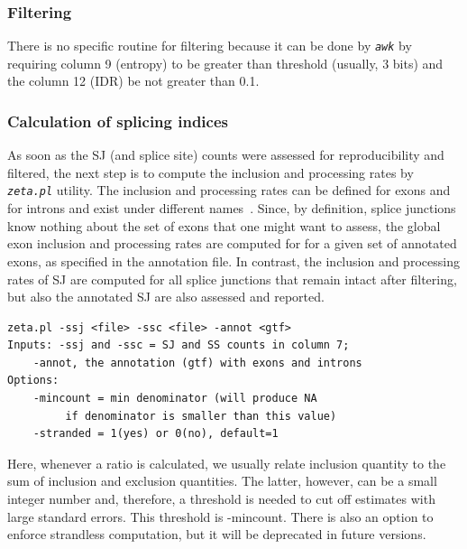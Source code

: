 \documentclass{article}
\newcommand{\prog}[1]{{\tt\em #1}}
\begin{document}
\subsubsection{Filtering}

There is no specific routine for filtering because it can be done by \prog{awk} by requiring column 9 (entropy)
to be greater than threshold (usually, 3 bits) and the column 12 (IDR) be not greater than 0.1.


\subsubsection{Calculation of splicing indices}
As soon as the SJ (and splice site) counts were assessed for reproducibility and filtered, the next step is to compute the inclusion and processing rates by \prog{zeta.pl} utility.
The inclusion and processing rates can be defined for exons and for introns and exist under different names~\cite{pmid23172860}. Since, by definition, splice junctions 
know nothing about the set of exons that one might want to assess, the  global exon inclusion and processing rates are computed for for a given set of 
annotated exons, as specified in the annotation file. In contrast, the inclusion and processing rates of SJ are computed for all splice junctions that remain
intact after filtering, but also the annotated SJ are also assessed and reported.

\begin{verbatim}
zeta.pl -ssj <file> -ssc <file> -annot <gtf>
Inputs:	-ssj and -ssc = SJ and SS counts in column 7;
	-annot, the annotation (gtf) with exons and introns
Options:
	-mincount = min denominator (will produce NA 
         if denominator is smaller than this value)
	-stranded = 1(yes) or 0(no), default=1
\end{verbatim}
Here, whenever a ratio is calculated, we usually relate inclusion quantity to the sum of inclusion and exclusion quantities. The latter, however, can be a 
small integer number and, therefore, a threshold is needed to cut off estimates with large standard errors. This threshold is -mincount. There is also an option 
to enforce strandless computation, but it will be deprecated in future versions.
\end{document}
